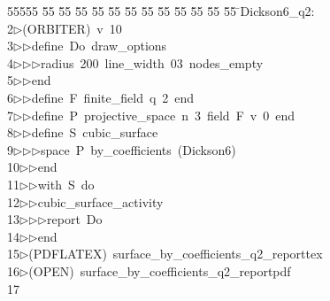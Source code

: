 %
%
\begin{tabbing}
55555 \= 55 \= 55 \= 55 \= 55 \= 55 \= 55 \= 55 \= 55 \= 55 \= 55 \= 55 \= 55 \= \>Dickson6\_q2:\\[0pt]
2\>$\triangleright$\>(ORBITER)\ v\ 10\ \\[0pt]
3\>$\triangleright$\>$\triangleright$\>define\ Do\ draw\_options\ \\[0pt]
4\>$\triangleright$\>$\triangleright$\>$\triangleright$\>radius\ 200\ line\_width\ 03\ nodes\_empty\ \\[0pt]
5\>$\triangleright$\>$\triangleright$\>end\ \\[0pt]
6\>$\triangleright$\>$\triangleright$\>define\ F\ finite\_field\ q\ 2\ end\ \\[0pt]
7\>$\triangleright$\>$\triangleright$\>define\ P\ projective\_space\ n\ 3\ field\ F\ v\ 0\ end\ \\[0pt]
8\>$\triangleright$\>$\triangleright$\>define\ S\ cubic\_surface\ \\[0pt]
9\>$\triangleright$\>$\triangleright$\>$\triangleright$\>space\ P\ by\_coefficients\ (Dickson6)\ \\[0pt]
10\>$\triangleright$\>$\triangleright$\>end\ \\[0pt]
11\>$\triangleright$\>$\triangleright$\>with\ S\ do\ \\[0pt]
12\>$\triangleright$\>$\triangleright$\>cubic\_surface\_activity\ \\[0pt]
13\>$\triangleright$\>$\triangleright$\>$\triangleright$\>report\ Do\ \\[0pt]
14\>$\triangleright$\>$\triangleright$\>end\\[0pt]
15\>$\triangleright$\>(PDFLATEX)\ surface\_by\_coefficients\_q2\_reporttex\\[0pt]
16\>$\triangleright$\>(OPEN)\ surface\_by\_coefficients\_q2\_reportpdf\\[0pt]
17\>\end{tabbing}
